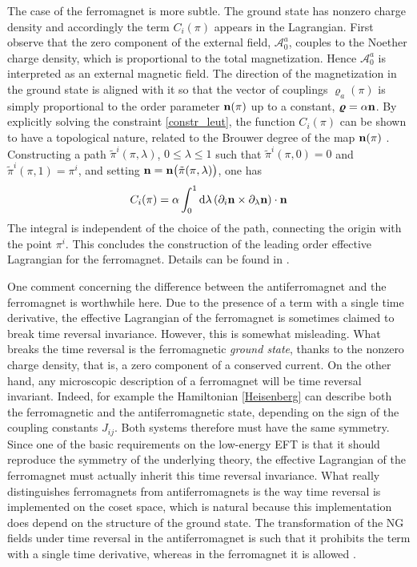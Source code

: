 \documentclass[final,2p,times,12pt,sort&compress]{elsarticle}
\newcommand\AAA{\mathscr{A}}                %
\newcommand\vek[1]{{\boldsymbol{\bf #1}}}   %
\newcommand\de{\partial}
\newcommand\vr{\varrho}
\newcommand\dd{\mathop{{\rm d}\!}\nolimits} %
\begin{document}
The case of the ferromagnet is more subtle. The ground state has nonzero charge
density and accordingly the term $C_i(\pi)$ appears in the Lagrangian. First
observe that the zero component of the external field, $\AAA_0^a$, couples to
the Noether charge density, which is proportional to the total magnetization.
Hence $\AAA_0^a$ is interpreted as an external magnetic field. The direction of
the magnetization in the ground state is aligned with it so that the
vector of couplings $\vr_a(\pi)$ is simply proportional to the order parameter
$\vek n(\pi)$ up to a constant, $\vek\vr=\alpha\vek n$. By explicitly solving
the constraint \eqref{constr_leut}, the function $C_i(\pi)$ can be shown to
have a topological nature, related to the Brouwer degree of the map $\vek
n(\pi)$ \cite{Leutwyler:1993gf}. Constructing a path $\tilde\pi^i(\pi,\lambda)$,
$0\leq\lambda\leq1$ such that $\tilde\pi^i(\pi,0)=0$ and
$\tilde\pi^i(\pi,1)=\pi^i$, and setting $\vek n=\vek
n\bigl(\tilde\pi(\pi,\lambda)\bigr)$, one has
\begin{equation}
C_i(\pi)=\alpha\int_0^1\dd\lambda\,(\de_i\vek n\times\de_\lambda\vek n)
\cdot\vek n
\end{equation}
The integral is independent of the choice of the path, connecting the origin
with the point $\pi^i$.  This concludes the construction of the leading order
effective Lagrangian for the ferromagnet. Details can be found in
\cite{Leutwyler:1993gf}.

One comment concerning the difference between the antiferromagnet and the
ferromagnet is worthwhile here. Due to the presence of a term with a single
time derivative, the effective Lagrangian of the ferromagnet is sometimes
claimed to break time reversal invariance. However, this is somewhat
misleading. What breaks the time reversal is the ferromagnetic \emph{ground
state}, thanks to the nonzero charge density, that is, a zero component of a
conserved current. On the other hand, any microscopic description of a
ferromagnet will be time reversal invariant. Indeed, for example the
Hamiltonian \eqref{Heisenberg} can describe both the ferromagnetic and the
antiferromagnetic state, depending on the sign of the coupling constants
$J_{ij}$. Both systems therefore must have the same symmetry. Since one of the
basic requirements on the low-energy EFT is that it should reproduce the
symmetry of the underlying theory, the effective Lagrangian of the ferromagnet
must actually inherit this time reversal invariance. What really distinguishes
ferromagnets from antiferromagnets is the way time reversal is implemented on
the coset space, which is natural because this implementation does depend on
the structure of the ground state. The transformation of the NG fields under
time reversal in the antiferromagnet is such that it prohibits the term with a
single time derivative, whereas in the ferromagnet it is allowed
\cite{Roman:1999ro}.
\end{document}
